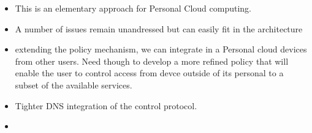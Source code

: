 \begin{itemize}
  \item This is an elementary approach for Personal Cloud computing. 
  \item A number of issues remain unandressed but can easily fit in the
        \signpost architecture
  \item extending the policy mechanism, we can integrate in a Personal cloud
        devices from other users. Need though to develop a more refined policy
        that will enable the user to control access from devce outside of its
        personal to a subset of the available services. 
  \item Tighter DNS integration of the control protocol.
  \item 
\end{itemize}
%
%
%


